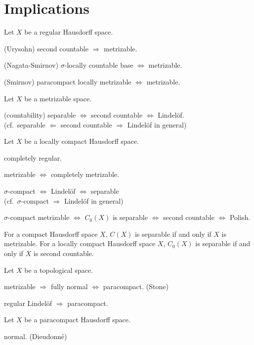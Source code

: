 \documentclass{../../large}
\begin{document}
\newpage
\section*{Implications}

\begin{prb}
Let $X$ be a regular Hausdorff space.
\begin{parts}
\item (Urysohn) second countable $\Rightarrow$ metrizable.
\item (Nagata-Smirnov) $\sigma$-locally countable base $\Leftrightarrow$ metrizable.
\item (Smirnov) paracompact locally metrizable $\Leftrightarrow$ metrizable.
\end{parts}
\end{prb}


\begin{prb}
Let $X$ be a metrizable space.
\begin{parts}
\item (countability) separable $\Leftrightarrow$ second countable $\Leftrightarrow$ Lindel\"of.\\
(cf.~separable $\Leftarrow$ second countable $\Rightarrow$ Lindel\"of in general)
\end{parts}
\end{prb}


\begin{prb}
Let $X$ be a locally compact Hausdorff space.
\begin{parts}
\item completely regular.
\item metrizable $\Leftrightarrow$ completely metrizable.
\item $\sigma$-compact $\Leftrightarrow$ Lindel\"of $\Leftrightarrow$ separable\\
(cf.~$\sigma$-compact $\Rightarrow$ Lindel\"of in general)
\item $\sigma$-compact metrizable $\Leftrightarrow$ $C_0(X)$ is separable $\Leftrightarrow$ second countable $\Leftrightarrow$ Polish.
\end{parts}
\end{prb}

For a compact Hausdorff space $X$, $C(X)$ is separable if and only if $X$ is metrizable.
For a locally compact Hausdorff space $X$, $C_0(X)$ is separable if and only if $X$ is second countable.


\begin{prb}
Let $X$ be a topological space.
\begin{parts}
\item metrizable $\Rightarrow$ fully normal $\Leftrightarrow$ paracompact. (Stone)
\item regular Lindel\"of $\Rightarrow$ paracompact.
\end{parts}
\end{prb}

\begin{prb}
Let $X$ be a paracompact Hausdorff space.
\begin{parts}
\item normal. (Dieudonn\'e)
\item
\end{parts}
\end{prb}
\end{document}
